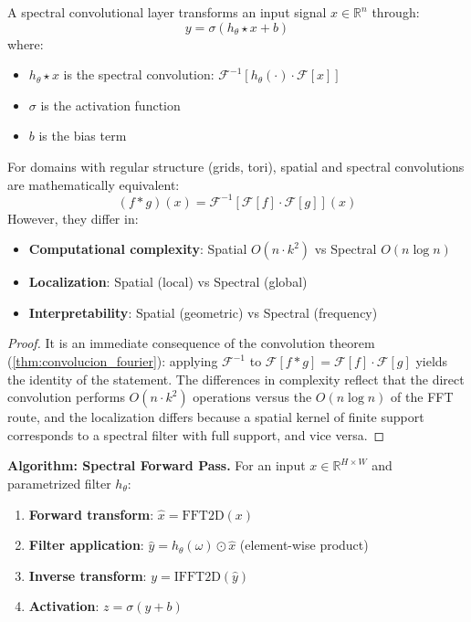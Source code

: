 \begin{definition}\label{def:capa_convolucional_espectral}
A spectral convolutional layer transforms an input signal $x \in \mathbb{R}^n$ through:
\begin{equation}
y = \sigma(h_\theta \star x + b)
\end{equation}
where:
\begin{itemize}
    \item $h_\theta \star x$ is the spectral convolution: $\mathcal{F}^{-1}[h_\theta(\cdot) \cdot \mathcal{F}[x]]$
    \item $\sigma$ is the activation function
    \item $b$ is the bias term
\end{itemize}
\end{definition}

\begin{theorem}\label{thm:equivalencia_espacial_espectral}
For domains with regular structure (grids, tori), spatial and spectral convolutions are mathematically equivalent:
\begin{equation}
(f * g)(x) = \mathcal{F}^{-1}[\mathcal{F}[f] \cdot \mathcal{F}[g]](x)
\end{equation}
However, they differ in:
\begin{itemize}
    \item \textbf{Computational complexity}: Spatial $O(n \cdot k^2)$ vs Spectral $O(n \log n)$
    \item \textbf{Localization}: Spatial (local) vs Spectral (global)
    \item \textbf{Interpretability}: Spatial (geometric) vs Spectral (frequency)
\end{itemize}
\end{theorem}

\begin{proof}
It is an immediate consequence of the convolution theorem (\autoref{thm:convolucion_fourier}): applying $\mathcal{F}^{-1}$ to $\mathcal{F}[f * g] = \mathcal{F}[f] \cdot \mathcal{F}[g]$ yields the identity of the statement. The differences in complexity reflect that the direct convolution performs $O(n \cdot k^2)$ operations versus the $O(n \log n)$ of the \gls{FFT} route, and the localization differs because a spatial kernel of finite support corresponds to a spectral filter with full support, and vice versa.
\end{proof}

\textbf{Algorithm: Spectral Forward Pass.}\label{alg:forward_espectral} For an input $x \in \mathbb{R}^{H \times W}$ and parametrized filter $h_\theta$:
\begin{enumerate}
    \item \textbf{Forward transform}: $\hat{x} = \text{FFT2D}(x)$
    \item \textbf{Filter application}: $\hat{y} = h_\theta(\omega) \odot \hat{x}$ (element-wise product)
    \item \textbf{Inverse transform}: $y = \text{IFFT2D}(\hat{y})$
    \item \textbf{Activation}: $z = \sigma(y + b)$
\end{enumerate}

